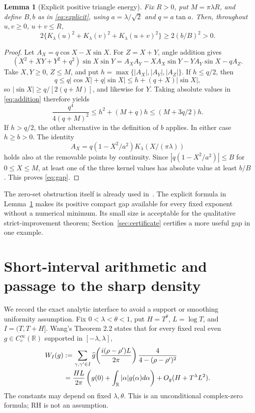 ﻿\documentclass[11pt]{article}
\newtheorem{lemma}[theorem]{Lemma}
\theoremstyle{remark}
\newcommand{\R}{\mathbb R}
\begin{document}
\begin{lemma}[Explicit positive triangle energy]\label{lem:gap}
Fix $R>0$, put $M=\pi\lambda R$, and define $B,b$ as in
\eqref{eq:explicit}, using $a=\lambda/\sqrt2$ and $q=a\tan a$.
Then, throughout $u,v\ge0$, $u+v\le R$,
\begin{equation}\label{eq:gap}
 2\{K_\lambda(u)^2+K_\lambda(v)^2+K_\lambda(u+v)^2\}
 \ge2(b/B)^2>0.
\end{equation}
\end{lemma}
\begin{proof}
Let $A_X=q\cos X-X\sin X$. For $Z=X+Y$, angle addition gives
\begin{equation}\label{eq:addition}
 (X^2+XY+Y^2+q^2)\sin X\sin Y
 =A_XA_Y-XA_X\sin Y-YA_Y\sin X-qA_Z.
\end{equation}
Take $X,Y\ge0$, $Z\le M$, and put
$h=\max\{|A_X|,|A_Y|,|A_Z|\}$. If $h\le q/2$, then
\[
 q\le q|\cos X|+q|\sin X|
 \le h+(q+X)|\sin X|,
\]
so $|\sin X|\ge q/[2(q+M)]$, and likewise for $Y$. Taking absolute
values in \eqref{eq:addition} therefore yields
\[
 \frac{q^4}{4(q+M)^2}\le h^2+(M+q)h
 \le(M+3q/2)h.
\]
If $h>q/2$, the other alternative in the definition of $b$ applies.
In either case $h\ge b>0$. The identity
\[
 A_X=q(1-X^2/a^2)K_\lambda(X/(\pi\lambda))
\]
holds also at the removable points by continuity. Since
$|q(1-X^2/a^2)|\le B$ for $0\le X\le M$, at least one of the three
kernel values has absolute value at least $b/B$. This proves
\eqref{eq:gap}.
\end{proof}

The zero-set obstruction itself is already used in~\cite{Ainta}. The
explicit formula in Lemma~\ref{lem:gap} makes its positive compact gap
available for every fixed exponent without a numerical minimum. Its
small size is acceptable for the qualitative strict-improvement theorem;
Section~\ref{sec:certificate} certifies a more useful gap in one example.

\section{Short-interval arithmetic and passage to the sharp density}

We record the exact analytic interface to avoid a support or smoothing
uniformity assumption. Fix $0<\lambda<\theta<1$, put $H=T^\theta$,
$L=\log T$, and $I=(T,T+H]$. Wang's Theorem 2.2 states that for every
fixed real even $g\in C_c^\infty(\R)$ supported in $[-\lambda,\lambda]$,
\begin{align}\label{eq:wangtest}
 W_I(g)&:=\sum_{\gamma,\gamma'\in I}
 \widehat g\!\left(\frac{i(\rho-\rho')L}{2\pi}\right)
 \frac4{4-(\rho-\rho')^2}\notag\\
 &=\frac{HL}{2\pi}\left(g(0)+\int_\R|\alpha|g(\alpha)d\alpha\right)
      +O_g(H+T^\lambda L^2).
\end{align}
The constants may depend on fixed $\lambda,\theta$. This is an
unconditional complex-zero formula; RH is not an assumption.
\end{document}
